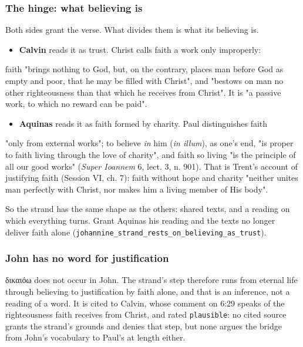 \documentclass[11pt]{article}
\begin{document}
\subsubsection*{The hinge: what believing is}
Both sides grant the verse. What divides them is what its believing is.

\begin{itemize}
  \item \textbf{Calvin} reads it as trust. Christ calls faith a work only improperly:
\end{itemize}
  faith "brings nothing to God, but, on the contrary, places man before God as   empty and poor, that he may be filled with Christ", and "bestows on man no   other righteousness than that which he receives from Christ". It is "a   passive work, to which no reward can be paid".

\begin{itemize}
  \item \textbf{Aquinas} reads it as faith formed by charity. Paul distinguishes faith
\end{itemize}
  "only from external works"; to believe \emph{in} him (\emph{in illum}), as one's end,   "is proper to faith living through the love of charity", and faith so living   "is the principle of all our good works" (\emph{Super Ioannem} 6, lect. 3, n. 901).   That is Trent's account of justifying faith (Session VI, ch. 7): faith   without hope and charity "neither unites man perfectly with Christ, nor makes   him a living member of His body".

So the strand has the same shape as the others: shared texts, and a reading on which everything turns. Grant Aquinas his reading and the texts no longer deliver faith alone (\texttt{johannine\_\allowbreak{}strand\_\allowbreak{}rests\_\allowbreak{}on\_\allowbreak{}believing\_\allowbreak{}as\_\allowbreak{}trust}).

\subsubsection*{John has no word for justification}
δικαιόω does not occur in John. The strand's step therefore runs from eternal life through believing to justification by faith alone, and that is an inference, not a reading of a word. It is cited to Calvin, whose comment on 6:29 speaks of the righteousness faith receives from Christ, and rated \texttt{plausible}: no cited source grants the strand's grounds and denies that step, but none argues the bridge from John's vocabulary to Paul's at length either.
\end{document}
